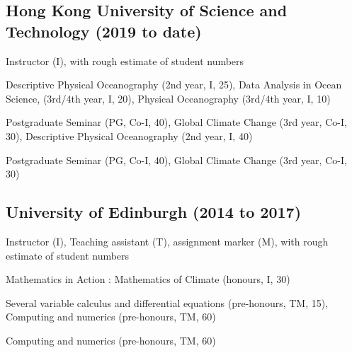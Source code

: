 \documentclass[letterpaper]{article}
\renewenvironment{itemize}{
  \begin{list}{}{
    \setlength{\leftmargin}{1.5em}
  }
}{
  \end{list}
}
\begin{document}
\subsection*{Hong Kong University of Science and Technology (2019 to date)}
\begin{itemize}
\item Instructor (I), with rough estimate of
student numbers
\begin{itemize}
  \item[21/22:] Descriptive Physical Oceanography (2nd year, I, 25), Data
  Analysis in Ocean Science, (3rd/4th year, I, 20), Physical Oceanography
  (3rd/4th year, I, 10)
  \item[20/21:] Postgraduate Seminar (PG, Co-I, 40), Global Climate Change (3rd
  year, Co-I, 30), Descriptive Physical Oceanography (2nd year, I, 40)
  \item[19/20:] Postgraduate Seminar (PG, Co-I, 40), Global Climate Change (3rd
  year, Co-I, 30)
\end{itemize}
\end{itemize}

\subsection*{University of Edinburgh (2014 to 2017)}
\begin{itemize}
\item Instructor (I), Teaching assistant (T), assignment marker (M), with rough estimate of
student numbers
\begin{itemize}
  \item[16/17:] Mathematics in Action : Mathematics of Climate (honours, I, 30)
	\item[15/16:] Several variable calculus and differential equations
	(pre-honours, TM, 15), Computing and numerics (pre-honours, TM, 60)
	\item[14/15:] Computing and numerics (pre-honours, TM, 60)
\end{itemize}
\end{itemize}

\end{document}
